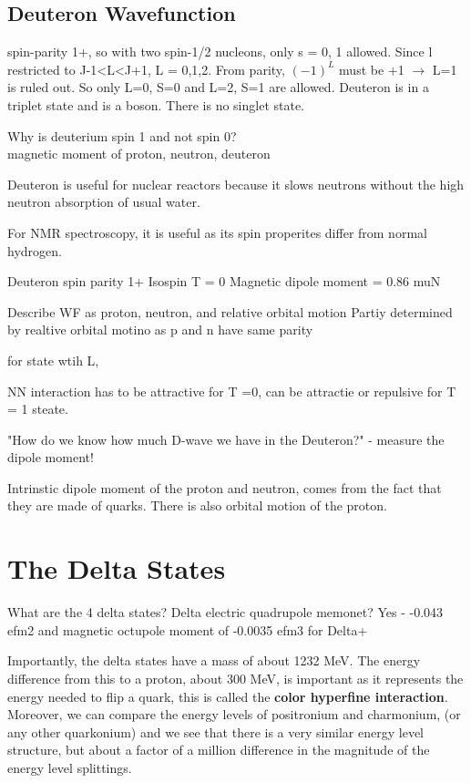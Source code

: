         \subsection{Deuteron Wavefunction}
            spin-parity 1+, so with two spin-1/2 nucleons, only s = 0, 1 allowed. Since l restricted to J-1<L<J+1, L = 0,1,2. From parity, $(-1)^L$ must be +1 $\xrightarrow{}$ L=1 is ruled out. So only L=0, S=0 and L=2, S=1 are allowed. Deuteron is in a triplet state and is a boson. There is no singlet state. 
            
            Why is deuterium spin 1 and not spin 0?\\
        
            magnetic moment of proton, neutron, deuteron
            
            
            Deuteron is useful for nuclear reactors because it slows neutrons without the high neutron absorption of usual water. 
            
            For NMR spectroscopy, it is useful as its spin properites differ from normal hydrogen. 
            
            
            Deuteron spin parity 1+
Isospin T = 0
Magnetic dipole moment = 0.86 muN

Describe WF as proton, neutron, and relative orbital motion
Partiy determined by realtive orbital motino as p and n have same parity

for state wtih L, 

NN interaction has to be attractive for T =0, can be attractie or repulsive for T = 1 steate. 

"How do we know how much D-wave we have in the Deuteron?" - measure the dipole moment!

Intrinstic dipole moment of the proton and neutron, comes from the fact that they are made of quarks. There is also orbital motion of the proton.

            
    \section{The Delta States}
            What are the 4 delta states?
            Delta electric quadrupole memonet? Yes - -0.043 efm2 and magnetic octupole moment of -0.0035 efm3 for Delta+
            
            Importantly, the delta states have a mass of about 1232 MeV. The energy difference from this to a proton, about 300 MeV, is important as it represents the energy needed to flip a quark, this is called the \textbf{color hyperfine interaction}. Moreover, we can compare the energy levels of positronium and charmonium, (or any other quarkonium) and we see that there is a very similar energy level structure, but about a factor of a million difference in the magnitude of the energy level splittings. 

